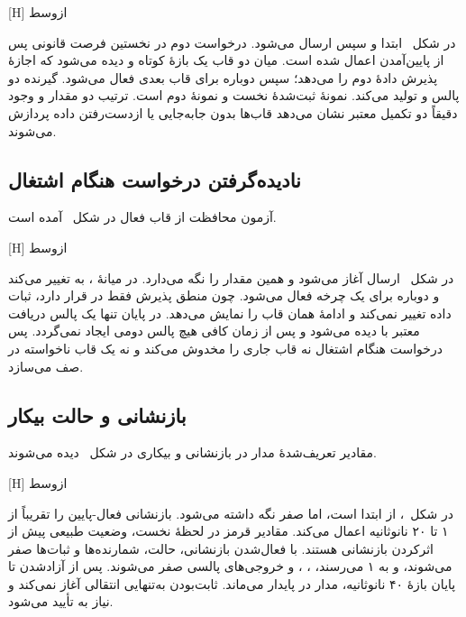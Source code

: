 [H]
‌ازوسط

در شکل~ ابتدا  و سپس  ارسال می‌شود. درخواست
دوم در نخستین فرصت قانونی پس از پایین‌آمدن  اعمال شده است. میان دو قاب یک بازهٔ
کوتاه  و  دیده می‌شود که اجازهٔ پذیرش دادهٔ دوم را می‌دهد؛ سپس
 دوباره برای قاب بعدی فعال می‌شود. گیرنده دو پالس  و
 تولید می‌کند. نمونهٔ ثبت‌شدهٔ نخست  و نمونهٔ دوم
 است. ترتیب دو مقدار و وجود دقیقاً دو تکمیل معتبر نشان می‌دهد قاب‌ها بدون
جابه‌جایی یا از‌دست‌رفتن داده پردازش می‌شوند.


\subsection{نادیده‌گرفتن درخواست هنگام اشتغال}

آزمون محافظت از قاب فعال در شکل~ آمده است.

[H]
‌ازوسط

در شکل~ ارسال  آغاز می‌شود و
 همین مقدار را نگه می‌دارد. در میانهٔ ،
 به  تغییر می‌کند و  دوباره برای یک چرخه فعال
می‌شود. چون منطق پذیرش فقط در  قرار دارد، ثبات داده تغییر نمی‌کند و 
ادامهٔ همان قاب  را نمایش می‌دهد. در پایان تنها یک پالس دریافت معتبر با
 دیده می‌شود و پس از زمان کافی هیچ پالس دومی ایجاد نمی‌گردد. پس
درخواست هنگام اشتغال نه قاب جاری را مخدوش می‌کند و نه یک قاب ناخواسته در صف می‌سازد.


\subsection{بازنشانی و حالت بیکار}

مقادیر تعریف‌شدهٔ مدار در بازنشانی و بیکاری در شکل~ دیده
می‌شوند.

[H]
‌ازوسط

در شکل~،  از ابتدا  است، اما
 صفر نگه داشته می‌شود.  بازنشانی فعال-پایین را تقریباً از ۱ تا
۲۰ نانوثانیه اعمال می‌کند. مقادیر قرمز  در لحظهٔ نخست، وضعیت طبیعی پیش از
اثرکردن بازنشانی هستند. با فعال‌شدن بازنشانی، حالت، شمارنده‌ها و ثبات‌ها صفر می‌شوند،
 و  به ۱ می‌رسند، ، ،
 و خروجی‌های پالسی صفر می‌شوند. پس از آزادشدن  تا پایان بازهٔ
۴۰ نانوثانیه، مدار در  پایدار می‌ماند. ثابت‌بودن  به‌تنهایی
انتقالی آغاز نمی‌کند و نیاز به  تأیید می‌شود.


